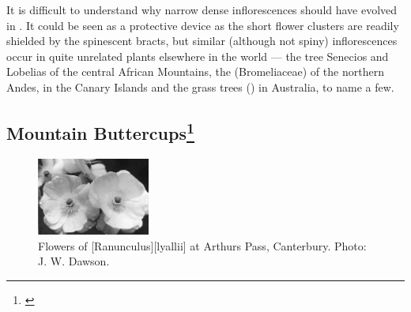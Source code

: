 It is difficult to understand why narrow dense inflorescences should have evolved in .
It could be seen as a protective device as the short flower clusters are readily shielded by the spinescent bracts, but similar (although not spiny) inflorescences occur in quite unrelated plants elsewhere in the world --- the tree Senecios and Lobelias of the central African Mountains, the  (Bromeliaceae) of the northern Andes,  in the Canary Islands and the grass trees () in Australia, to name a few.

\subsection[Mountain Buttercups]{Mountain Buttercups\thinspace\footnote{\cite{fisher1965alpine}}}

\begin{figure}
	\includegraphics[width=0.33\textwidth]{graphics/figure99ranunculus.jpg}
	\centering
	\caption[Flowers of \emph{Ranunculus lyallii}]{Flowers of [Ranunculus][lyallii] at Arthurs Pass, Canterbury.
	Photo: J. W. Dawson.}%
	\label{fig:99ranunculus}
\end{figure}


